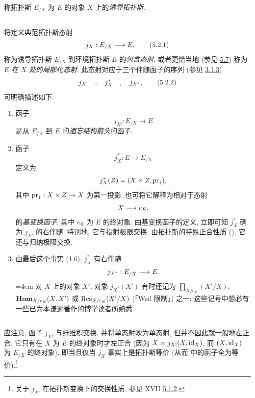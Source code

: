 称拓扑斯 $E_{/X}$ 为 $E$ 的对象 $X$ 上的\emph{诱导拓扑斯}.

\subsection{}
将定义典范拓扑斯态射
\begin{equation*}
j_X:E_{/X}\longrightarrow E{},\tag{5.2.1}
\end{equation*}
称为诱导拓扑斯 $E_{/X}$ 到环境拓扑斯 $E$ 的\emph{包含态射}, 或者更恰当地 (参见 \hyperref[IV.subsec5.7]{5.7}) 称为 \emph{$E$ 在 $X$ 处的局部化态射}. 此态射对应于三个伴随函子的序列 (参见 \hyperref[IV.subsubsec3.1.3]{3.1.3})
\begin{equation*}
j_{X!}\quad,\quad j^{\ast}_X\quad,\quad j_{X^{\ast}}{},\tag{5.2.2}
\end{equation*}
可明确描述如下:
\begin{enumerate}
\renewcommand{\theenumi}{\alph{enumi}}
\renewcommand{\labelenumi}{\theenumi)}
\item 函子
$$
j_{X!}:E_{/X}\longrightarrow E
$$
是从 $E_{/X}$ 到 $E$ 的\emph{遗忘结构箭头}的函子.

\item 函子
$$
j^{\ast}_X:E\longrightarrow E_{/X}
$$
定义为
$$
j^{\ast}_X(Z)=(X\times Z, \operatorname{pr}_1){},
$$
其中 $\operatorname{pr}_1:X\times Z\rightarrow X$ 为第一投影. 也可将它解释为相对于态射
$$
X\longrightarrow e_E{},
$$
的\emph{基变换函子}, 其中 $e_E$ 为 $E$ 的终对象. 由基变换函子的定义, 立即可知 $j^{\ast}_X$ 确为 $j_{X!}$ 的右伴随. 特别地, 它与投射极限交换. 由拓扑斯的特殊正合性质 (), 它还与归纳极限交换.\pageoriginale

\item 由最后这个事实 (\hyperref[IV.cor1.6]{1.6}), $j^{\ast}_X$ 有右伴随
$$
j_{X^{\ast}}:E_{/X}\longrightarrow E{}.
$$
\begingroup{}\emergencystretch=4em
对 $X$ 上的对象 $X'$, 对象 $j_{X^{\ast}}(X')$ 有时还记为 $\prod_{X/e_E}(X'/X)$, $\operatorname{\mathbf{Hom}}_{X/e_E}(X,X')$ 或 $\operatorname{Res}_{X/e_E}(X'/X)$ (「Weil 限制」) 之一; 这些记号中想必有一些已为本谦逊著作的博学读者所熟悉.\par
\endgroup
\end{enumerate}

\subsection{}
应注意, 函子 $j_{X!}$ 与纤维积交换, 并将单态射映为单态射, 但并不因此就一般地左正合. 它只有在 $X$ 为 $E$ 的终对象时才左正合 (因为 $X=j_{X!}(X,\operatorname{id}_X)$, 而 $(X,\operatorname{id}_X)$ 为 $E_{/X}$ 的终对象), 即当且仅当 $j_X$ 事实上是拓扑斯等价 (从而  中的函子全为等价).\footnote[1]{关于 $j_{X!}$ 在拓扑斯变换下的交换性质, 参见 XVII \hyperref[XVII.lem5.1.2]{5.1.2}.}

